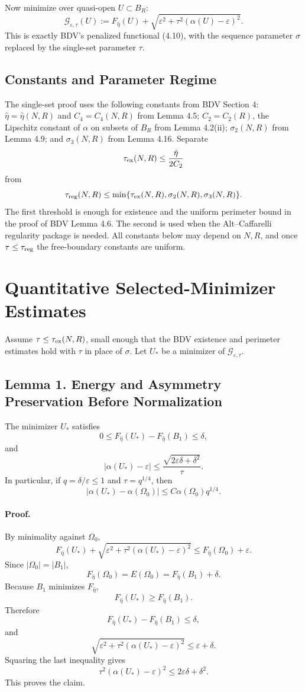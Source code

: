 \documentclass[11pt]{article}
\begin{document}
Now minimize over quasi-open \(U\subset B_R\):
\[
\mathcal G_{\varepsilon,\tau}(U)
:=
F_{\hat\eta}(U)
+
\sqrt{\varepsilon^2+\tau^2(\alpha(U)-\varepsilon)^2}.
\]
This is exactly BDV's penalized functional (4.10), with the sequence parameter
\(\sigma\) replaced by the single-set parameter \(\tau\).

\subsection*{Constants and Parameter Regime}

The single-set proof uses the following constants from BDV Section 4:
\(\hat\eta=\hat\eta(N,R)\) and \(C_4=C_4(N,R)\) from Lemma 4.5;
\(C_2=C_2(R)\), the Lipschitz constant of \(\alpha\) on subsets of \(B_R\)
from Lemma 4.2(ii); \(\sigma_2(N,R)\) from Lemma 4.9; and
\(\sigma_3(N,R)\) from Lemma 4.16. Separate
\[
\tau_{\rm ex}(N,R)\le \frac{\hat\eta}{2C_2}
\]
from
\[
\tau_{\rm reg}(N,R)
\le
\min\{\tau_{\rm ex}(N,R),\sigma_2(N,R),\sigma_3(N,R)\}.
\]
The first threshold is enough for existence and the uniform perimeter bound in
the proof of BDV Lemma 4.6. The second is used when the Alt--Caffarelli
regularity package is needed. All constants below may depend on \(N,R\), and
once \(\tau\le\tau_{\rm reg}\) the free-boundary constants are uniform.

\section{Quantitative Selected-Minimizer Estimates}

Assume \(\tau\le\tau_{\rm ex}(N,R)\), small enough that the BDV existence and
perimeter estimates hold with \(\tau\) in place of \(\sigma\). Let
\(U_*\) be a minimizer of \(\mathcal G_{\varepsilon,\tau}\).

\subsection*{Lemma 1. Energy and Asymmetry Preservation Before Normalization}

The minimizer \(U_*\) satisfies
\[
0\le
F_{\hat\eta}(U_*)-F_{\hat\eta}(B_1)
\le
\delta,
\]
and
\[
|\alpha(U_*)-\varepsilon|
\le
\frac{\sqrt{2\varepsilon\delta+\delta^2}}{\tau}.
\]
In particular, if \(q=\delta/\varepsilon\le1\) and \(\tau=q^{1/4}\), then
\[
|\alpha(U_*)-\alpha(\Omega_0)|
\le
C\alpha(\Omega_0)q^{1/4}.
\]

\paragraph{Proof.}
By minimality against \(\Omega_0\),
\[
F_{\hat\eta}(U_*)
+
\sqrt{\varepsilon^2+\tau^2(\alpha(U_*)-\varepsilon)^2}
\le
F_{\hat\eta}(\Omega_0)+\varepsilon.
\]
Since \(|\Omega_0|=|B_1|\),
\[
F_{\hat\eta}(\Omega_0)=E(\Omega_0)
=F_{\hat\eta}(B_1)+\delta.
\]
Because \(B_1\) minimizes \(F_{\hat\eta}\),
\[
F_{\hat\eta}(U_*)\ge F_{\hat\eta}(B_1).
\]
Therefore
\[
F_{\hat\eta}(U_*)-F_{\hat\eta}(B_1)\le\delta,
\]
and
\[
\sqrt{\varepsilon^2+\tau^2(\alpha(U_*)-\varepsilon)^2}
\le
\varepsilon+\delta.
\]
Squaring the last inequality gives
\[
\tau^2(\alpha(U_*)-\varepsilon)^2
\le
2\varepsilon\delta+\delta^2.
\]
This proves the claim.
\end{document}
